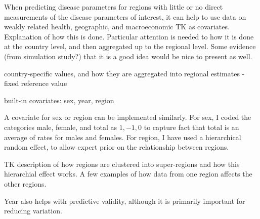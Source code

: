 When predicting disease parameters for regions with little or no
direct measurements of the disease parameters of interest, it can help
to use data on weakly related health, geographic, and macroeconomic TK
as covariates. Explanation of how this is done.  Particular attention
is needed to how it is done at the country level, and then aggregated
up to the regional level. Some evidence (from simulation study?) that
it is a good idea would be nice to present as well.

country-specific values, and how they are aggregated into regional
estimates - fixed reference value

built-in covariates: sex, year, region


A covariate for sex or region can be implemented similarly.  For sex,
I coded the categories male, female, and total as $1, -1, 0$ to
capture fact that total is an average of rates for males and females.
For region, I have used a hierarchical random effect, to allow expert
prior on the relationship between regions.

TK description of how regions are clustered into super-regions and how
this hierarchial effect works.  A few examples of how data from one
region affects the other regions.

Year also helps with predictive validity, although it is primarily
important for reducing variation.
